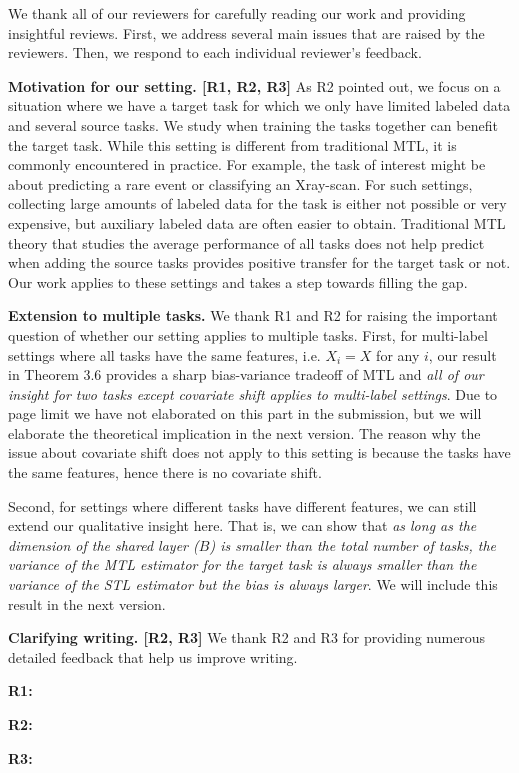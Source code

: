 \documentclass{article}
\begin{document}
We thank all of our reviewers for carefully reading our work and providing insightful reviews.
First, we address several main issues that are raised by the reviewers.
Then, we respond to each individual reviewer's feedback.

\textbf{Motivation for our setting. [R1, R2, R3]}
As R2 pointed out, we focus on a situation where we have a target task for which we only have limited labeled data and several source tasks.
We study when training the tasks together can benefit the target task.
While this setting is different from traditional MTL, it is commonly encountered in practice. For example, the task of interest might be about predicting a rare event or classifying an Xray-scan.
For such settings, collecting large amounts of labeled data for the task is either not possible or very expensive, but auxiliary labeled data are often easier to obtain.
Traditional MTL theory that studies the average performance of all tasks does not help predict when adding the source tasks provides positive transfer for the target task or not.
Our work applies to these settings and takes a step towards filling the gap.

\textbf{Extension to multiple tasks.}
We thank R1 and R2 for raising the important question of whether our setting applies to multiple tasks.
First, for multi-label settings where all tasks have the same features, i.e. $X_i = X$ for any $i$, our result in Theorem 3.6 provides a sharp bias-variance tradeoff of MTL and \textit{all of our insight for two tasks except covariate shift applies to multi-label settings}.
Due to page limit we have not elaborated on this part in the submission, but we will elaborate the theoretical implication in the next version.
The reason why the issue about covariate shift does not apply to this setting is because the tasks have the same features, hence there is no covariate shift.

Second, for settings where different tasks have different features, we can still extend our qualitative insight here.
That is, we can show that \textit{as long as the dimension of the shared layer ($B$) is smaller than the total number of tasks, the variance of the MTL estimator for the target task is always smaller than the variance of the STL estimator but the bias is always larger}.
We will include this result in the next version.

\textbf{Clarifying writing. [R2, R3]}
We thank R2 and R3 for providing numerous detailed feedback that help us improve writing.

\textbf{R1:}

\textbf{R2:}

\textbf{R3:}
\end{document}
